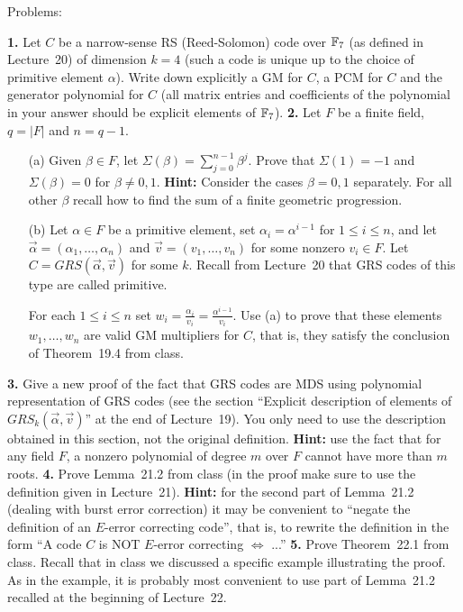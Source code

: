 \documentclass[12pt]{amsart}
\begin{document}
\bf\centerline{Problems: }\rm
\skv
{\bf 1.} Let $C$ be a narrow-sense RS (Reed-Solomon) code over ${\mathbb F}_7$ (as defined in Lecture~20) of dimension $k=4$ (such a code is unique up to the choice of primitive element $\alpha$). Write down explicitly a GM for $C$, a PCM for $C$ and the generator polynomial for $C$ (all matrix entries and coefficients of the polynomial in your answer should be explicit elements of ${\mathbb F}_7$).
\skv
{\bf 2.} Let $F$ be a finite field, $q=|F|$ and $n=q-1$. 
\begin{itemize}
\item[(a)] Given $\beta\in F$, let $\Sigma(\beta)=\sum\limits_{j=0}^{n-1}\beta^j$. Prove that $\Sigma(1)= -1$ and $\Sigma(\beta)= 0$
for $\beta\neq 0,1$. {\bf Hint:} Consider the cases $\beta=0,1$ separately. For all other $\beta$ recall how to find the sum of a finite geometric progression. 
\item[(b)] Let $\alpha\in F$ be a primitive element, set $\alpha_i=\alpha^{i-1}$ for $1\leq i\leq n$, and
let $\vec{\alpha}=(\alpha_1,\ldots,\alpha_n)$ and $\vec{v}=(v_1,\ldots, v_n)$ for some nonzero $v_i\in F$.
Let $C=GRS(\vec{\alpha}, \vec{v})$ for some $k$. Recall from Lecture~20 that GRS codes of this type are called primitive.

For each $1\leq i\leq n$ set $w_i=\frac{\alpha_i}{v_i}=\frac{\alpha^{i-1}}{v_i}$. Use (a) to prove that these elements $w_1,\ldots, w_n$ are valid GM multipliers for $C$, that is, they satisfy the conclusion of Theorem~19.4 from class.
\end{itemize}
\skv
{\bf 3.} Give a new proof of the fact that GRS codes are MDS using polynomial representation of GRS codes (see the section
``Explicit description of elements of $GRS_k(\vec{\alpha}, \vec{v})$'' at the end of Lecture~19). You only need to use the description obtained in this section, not the original definition. {\bf Hint:} use the fact that for any field $F$, a nonzero polynomial of degree $m$ over $F$ cannot have more than $m$ roots.
\skv
{\bf 4.} Prove Lemma~21.2 from class (in the proof make sure to use the definition given in Lecture~21). {\bf Hint:} for the second part of Lemma~21.2 (dealing with burst error correction) it may be convenient to ``negate the definition of an
$E$-error correcting code'', that is, to rewrite the definition in the form ``A code $C$ is NOT $E$-error correcting $\iff$ ...''
\skv
{\bf 5.} Prove Theorem~22.1 from class. Recall that in class we discussed a specific example illustrating the proof. As in the example, it is probably most convenient to use part of Lemma~21.2 recalled at the beginning of Lecture~22.
\end{document}
